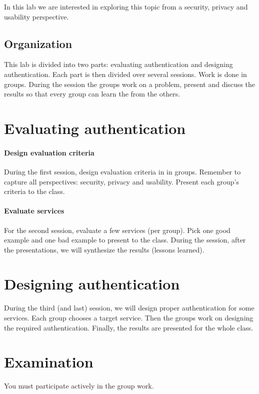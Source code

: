 In this lab we are interested in exploring this topic from a security, privacy 
and usability perspective.

\subsection{Organization}

This lab is divided into two parts: evaluating authentication and designing 
authentication.
Each part is then divided over several sessions.
Work is done in groups.
During the session the groups work on a problem, present and discuss the 
results so that every group can learn the from the others.


\section{Evaluating authentication}

\paragraph{Design evaluation criteria}

During the first session, design evaluation criteria in in groups.
Remember to capture all perspectives: security, privacy and usability.
Present each group's criteria to the class.

\paragraph{Evaluate services}

For the second session, evaluate a few services (per group).
Pick one good example and one bad example to present to the class.
During the session, after the presentations, we will synthesize the results 
(lessons learned).


\section{Designing authentication}

During the third (and last) session, we will design proper authentication for 
some services.
Each group chooses a target service.
Then the groups work on designing the required authentication.
Finally, the results are presented for the whole class.


\section{Examination}

You must participate actively in the group work.



\begin{frame}[allowframebreaks]
  \printbibliography
\end{frame}
